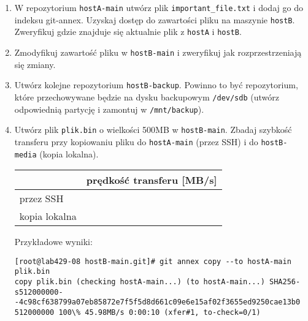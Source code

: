 \documentclass[polish]{article}
\newif\ifteacher
\begin{document}
\begin{enumerate}
    \begin{lstlisting}
git@hostA:~$ git init hostA-main.git
git@hostA:~$ cd hostA-main.git
git@hostA:hostA-main.git$ git annex init 'hostA - main'

...

git@hostA:hostA-main.git$ git remote add hostB-main git@hostB:hostB-main.git
    \end{lstlisting}

    \item
    W repozytorium \texttt{hostA-main} utwórz plik \texttt{important\_file.txt}
    i dodaj go do indeksu git-annex. Uzyskaj dostęp do zawartości pliku na
    maszynie \texttt{hostB}. Zweryfikuj gdzie znajduje się aktualnie plik z
    \texttt{hostA} i \texttt{hostB}.

    \item
    Zmodyfikuj zawartość pliku w \texttt{hostB-main} i zweryfikuj jak
    rozprzestrzeniają się zmiany.

    \item
    Utwórz kolejne repozytorium \texttt{hostB-backup}.
    Powinno to być repozytorium, które przechowywane będzie na dysku backupowym
    \texttt{/dev/sdb} (utwórz odpowiednią partycję i zamontuj w
    \texttt{/mnt/backup}).

\ifteacher
    \begin{lstlisting}
hostB$ fdisk /dev/sdb -> utworzenie nowej partycji
hostB$ mkfs.ext4 /dev/sdb1
hostB$ mkdir /mnt/backup
hostB$ mount /dev/sdb1 /mnt/backup
    \end{lstlisting}
\fi

    \item
    Utwórz plik \texttt{plik.bin} o wielkości 500MB w \texttt{hostB-main}.
    Zbadaj szybkość
    transferu przy kopiowaniu pliku do \texttt{hostA-main} (przez SSH) i do
    \texttt{hostB-media} (kopia lokalna).

    \begin{tabular}{|l|p{}|}
    \hline
    & prędkość transferu [MB/s] \\
    \hline
    przez SSH & \\
    \hline
    kopia lokalna & \\
    \hline
    \end{tabular}

\ifteacher
    Przykładowe wyniki:

    \begin{lstlisting}
[root@lab429-08 hostB-main.git]# git annex copy --to hostA-main plik.bin
copy plik.bin (checking hostA-main...) (to hostA-main...) SHA256-s512000000--4c98cf638799a07eb85872e7f5f5d8d661c09e6e15af02f3655ed9250cae13b0
512000000 100\% 45.98MB/s 0:00:10 (xfer#1, to-check=0/1)


\end{lstlisting}
\end{enumerate}
\end{document}
